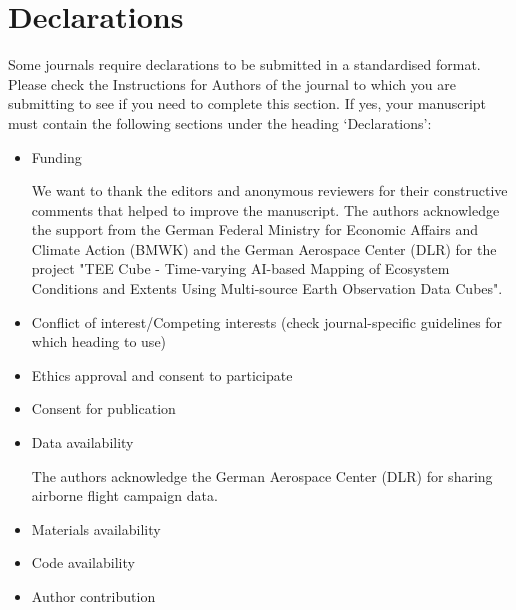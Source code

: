 \documentclass[pdflatex,sn-mathphys-num]{sn-jnl}%
\theoremstyle{thmstyleone}%
\theoremstyle{thmstyletwo}%
\theoremstyle{thmstylethree}%
\begin{document}
\section*{Declarations}

Some journals require declarations to be submitted in a standardised format. Please check the Instructions for Authors of the journal to which you are submitting to see if you need to complete this section. If yes, your manuscript must contain the following sections under the heading `Declarations':

\begin{itemize}
\item Funding


We want to thank the editors and anonymous reviewers for their constructive comments that helped to improve the manuscript. The authors acknowledge the support from the German Federal Ministry for Economic Affairs and Climate Action (BMWK) and the German Aerospace Center (DLR) for the project "TEE Cube - Time-varying AI-based Mapping of Ecosystem Conditions and Extents Using Multi-source Earth Observation Data Cubes".

\item Conflict of interest/Competing interests (check journal-specific guidelines for which heading to use)
\item Ethics approval and consent to participate
\item Consent for publication
\item Data availability 

The authors acknowledge the German Aerospace Center (DLR) for sharing airborne flight campaign data.


\item Materials availability
\item Code availability 
\item Author contribution
\end{itemize}

\noindent


\begin{appendices}
\section{}\label{secA1}
\end{appendices}


\end{document}
